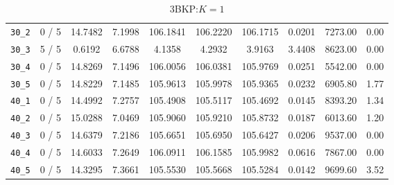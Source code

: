 \begin{table}[h!]
\begin{center}
\begin{tabular}{| c | c | c | c | c | c | c | c | c | c |}
\verb|30_2| & 0 / 5 & 14.7482 & 7.1998 & 106.1841 & 106.2220 & 106.1715 & 0.0201 & 7273.00 & 0.00\\ 
\verb|30_3| & 5 / 5 & 0.6192 & 6.6788 & 4.1358 & 4.2932 & 3.9163 & 3.4408 & 8623.00 & 0.00\\ 
\verb|30_4| & 0 / 5 & 14.8269 & 7.1496 & 106.0056 & 106.0381 & 105.9769 & 0.0251 & 5542.00 & 0.00\\ 
\verb|30_5| & 0 / 5 & 14.8229 & 7.1485 & 105.9613 & 105.9978 & 105.9365 & 0.0232 & 6905.80 & 1.77\\ 
\verb|40_1| & 0 / 5 & 14.4992 & 7.2757 & 105.4908 & 105.5117 & 105.4692 & 0.0145 & 8393.20 & 1.34\\ 
\verb|40_2| & 0 / 5 & 15.0288 & 7.0469 & 105.9060 & 105.9210 & 105.8732 & 0.0187 & 6013.60 & 1.20\\ 
\verb|40_3| & 0 / 5 & 14.6379 & 7.2186 & 105.6651 & 105.6950 & 105.6427 & 0.0206 & 9537.00 & 0.00\\ 
\verb|40_4| & 0 / 5 & 14.6033 & 7.2649 & 106.0911 & 106.1585 & 105.9982 & 0.0616 & 7867.00 & 0.00\\ 
\verb|40_5| & 0 / 5 & 14.3295 & 7.3661 & 105.5530 & 105.5668 & 105.5284 & 0.0142 & 9699.60 & 3.52\\ 
\hline
\end{tabular}
\caption{3BKP:$K=1$}
\label{table:3BKP}
\end{center}
\end{table}




